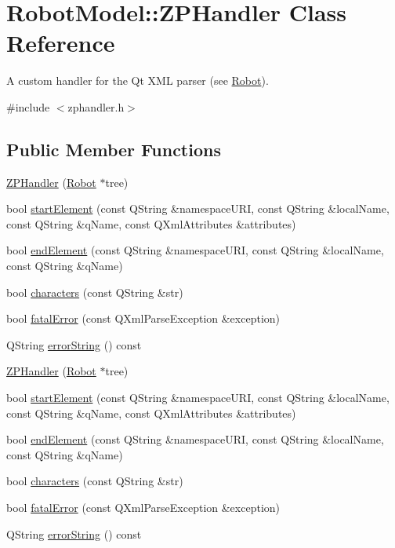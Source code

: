 \hypertarget{class_robot_model_1_1_z_p_handler}{
\section{RobotModel::ZPHandler Class Reference}
\label{class_robot_model_1_1_z_p_handler}
}


A custom handler for the Qt XML parser (see \hyperlink{class_robot_model_1_1_robot}{Robot}).  


{\ttfamily \#include $<$zphandler.h$>$}\subsection*{Public Member Functions}
\begin{DoxyCompactItemize}
\item 
\hyperlink{class_robot_model_1_1_z_p_handler_aa418554ca19e4c6f79cf7c2b3e747723}{ZPHandler} (\hyperlink{class_robot_model_1_1_robot}{Robot} $\ast$tree)
\item 
bool \hyperlink{class_robot_model_1_1_z_p_handler_a4041ee7deb5a59d83d6eab98101844d9}{startElement} (const QString \&namespaceURI, const QString \&localName, const QString \&qName, const QXmlAttributes \&attributes)
\item 
bool \hyperlink{class_robot_model_1_1_z_p_handler_ab058af372b5178f8877907ee45b8257d}{endElement} (const QString \&namespaceURI, const QString \&localName, const QString \&qName)
\item 
bool \hyperlink{class_robot_model_1_1_z_p_handler_a246f066600bede52d4321d0ccebd5cec}{characters} (const QString \&str)
\item 
bool \hyperlink{class_robot_model_1_1_z_p_handler_a442f6837417a1baa0d60641ddd854109}{fatalError} (const QXmlParseException \&exception)
\item 
QString \hyperlink{class_robot_model_1_1_z_p_handler_aca3c34530b327d635a4e915992f576de}{errorString} () const 
\item 
\hyperlink{class_robot_model_1_1_z_p_handler_a190c3fda1bc3ad017b9b2e44744c3057}{ZPHandler} (\hyperlink{class_robot_model_1_1_robot}{Robot} $\ast$tree)
\item 
bool \hyperlink{class_robot_model_1_1_z_p_handler_a5ed52c5d331fa5e54c41b905898fd936}{startElement} (const QString \&namespaceURI, const QString \&localName, const QString \&qName, const QXmlAttributes \&attributes)
\item 
bool \hyperlink{class_robot_model_1_1_z_p_handler_ae58bf36c338a6c4c7cc021d0e0534c5c}{endElement} (const QString \&namespaceURI, const QString \&localName, const QString \&qName)
\item 
bool \hyperlink{class_robot_model_1_1_z_p_handler_af3771144675a93929a3926bafbad2a99}{characters} (const QString \&str)
\item 
bool \hyperlink{class_robot_model_1_1_z_p_handler_ad56355b01366e4d0cb9137ad094d1280}{fatalError} (const QXmlParseException \&exception)
\item 
QString \hyperlink{class_robot_model_1_1_z_p_handler_aefc7dde46f775b9fe6f30cf46d1b7b3c}{errorString} () const 
\end{DoxyCompactItemize}



